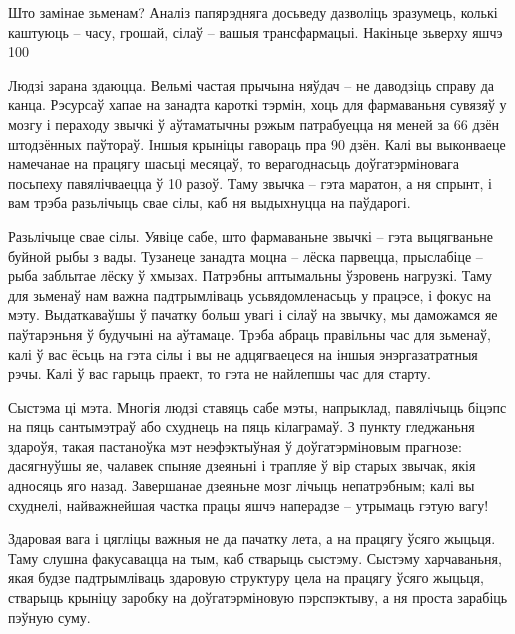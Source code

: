Што замінае зьменам? Аналіз папярэдняга досьведу дазволіць зразумець, колькі каштуюць – часу, грошай, сілаў – вашыя трансфармацыі. Накіньце зьверху яшчэ 100%

Людзі зарана здаюцца. Вельмі частая прычына няўдач – не даводзіць справу да канца. Рэсурсаў хапае на занадта кароткі тэрмін, хоць для фармаваньня сувязяў у мозгу і пераходу звычкі ў аўтаматычны рэжым патрабуецца ня меней за 66 дзён штодзённых паўтораў. Іншыя крыніцы гавораць пра 90 дзён. Калі вы выконваеце намечанае на працягу шасьці месяцаў, то верагоднасьць доўгатэрміновага посьпеху павялічваецца ў 10 разоў. Таму звычка – гэта маратон, а ня спрынт, і вам трэба разьлічыць свае сілы, каб ня выдыхнуцца на паўдарогі.

Разьлічыце свае сілы. Уявіце сабе, што фармаваньне звычкі – гэта выцягваньне буйной рыбы з вады. Тузанеце занадта моцна – лёска парвецца, прыслабіце – рыба заблытае лёску ў хмызах. Патрэбны аптымальны ўзровень нагрузкі. Таму для зьменаў нам важна падтрымліваць усьвядомленасьць у працэсе, і фокус на мэту. Выдаткаваўшы ў пачатку больш увагі і сілаў на звычку, мы даможамся яе паўтарэньня ў будучыні на аўтамаце. Трэба абраць правільны час для зьменаў, калі ў вас ёсьць на гэта сілы і вы не адцягваецеся на іншыя энэргазатратныя рэчы. Калі ў вас гарыць праект, то гэта не найлепшы час для старту.

Сыстэма ці мэта. Многія людзі ставяць сабе мэты, напрыклад, павялічыць біцэпс на пяць сантымэтраў або схуднець на пяць кілаграмаў. З пункту гледжаньня здароўя, такая пастаноўка мэт неэфэктыўная ў доўгатэрміновым прагнозе: дасягнуўшы яе, чалавек спыняе дзеяньні і трапляе ў вір старых звычак, якія адносяць яго назад. Завершанае дзеяньне мозг лічыць непатрэбным; калі вы схуднелі, найважнейшая частка працы яшчэ наперадзе – утрымаць гэтую вагу! 

Здаровая вага і цягліцы важныя не да пачатку лета, а на працягу ўсяго жыцьця. Таму слушна факусавацца на тым, каб стварыць сыстэму. Сыстэму харчаваньня, якая будзе падтрымліваць здаровую структуру цела на працягу ўсяго жыцьця, стварыць крыніцу заробку на доўгатэрміновую пэрспэктыву, а ня проста зарабіць пэўную суму.

